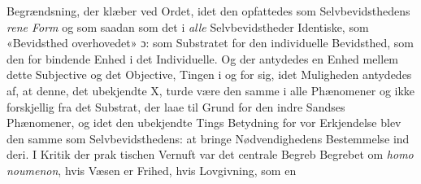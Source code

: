 \documentclass[12pt,a4paper]{book}
\begin{document}
Begrændsning, der klæber ved Ordet, idet den opfattedes som
Selvbevidsthedens \emph{rene Form} og som saadan som det i \emph{alle}
Selvbevidstheder Identiske, som «Bevidsthed overhovedet»
ɔ: som Substratet for den individuelle Bevidsthed, som den for\-%
bindende Enhed i det Individuelle. Og der antydedes en Enhed
mellem dette Subjective og det Objective, Tingen i og for sig,
idet Muligheden antydedes af, at denne, det ubekjendte X,
turde være den samme i alle Phænomener og ikke forskjellig
fra det Substrat, der laae til Grund for den indre Sandses
Phænomener, og idet den ubekjendte Tings Betydning for vor
Erkjendelse blev den samme som Selvbevidsthedens: at bringe
Nødvendighedens Bestemmelse ind deri. I Kritik der prak\-%
tischen Vernuft var det centrale Begreb Begrebet om \emph{homo
noumenon}, hvis Væsen er Frihed, hvis Lovgivning, som en
\end{document}

